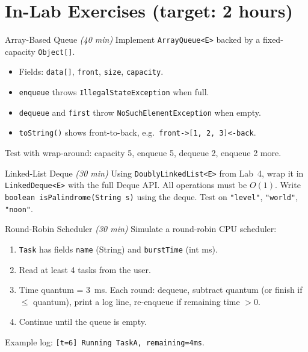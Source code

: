 \documentclass[11pt]{article}
\begin{document}
\section*{In-Lab Exercises (target: 2 hours)}

\begin{labexercise}{Array-Based Queue \hfill {\small \itshape (40 min)}}
Implement \texttt{ArrayQueue<E>} backed by a fixed-capacity \texttt{Object[]}.
\begin{itemize}[leftmargin=*,nosep]
  \item Fields: \texttt{data[]}, \texttt{front}, \texttt{size}, \texttt{capacity}.
  \item \texttt{enqueue} throws \texttt{IllegalStateException} when full.
  \item \texttt{dequeue} and \texttt{first} throw \texttt{NoSuchElementException} when empty.
  \item \texttt{toString()} shows front-to-back, e.g.\ \texttt{front->[1, 2, 3]<-back}.
\end{itemize}
Test with wrap-around: capacity 5, enqueue 5, dequeue 2, enqueue 2 more.
\end{labexercise}

\begin{labexercise}{Linked-List Deque \hfill {\small \itshape (30 min)}}
Using \texttt{DoublyLinkedList<E>} from Lab~4, wrap it in \texttt{LinkedDeque<E>}
with the full Deque API. All operations must be $O(1)$.
Write \texttt{boolean isPalindrome(String s)} using the deque.
Test on \texttt{"level"}, \texttt{"world"}, \texttt{"noon"}.
\end{labexercise}

\begin{labexercise}{Round-Robin Scheduler \hfill {\small \itshape (30 min)}}
Simulate a round-robin CPU scheduler:
\begin{enumerate}[leftmargin=*,nosep]
  \item \texttt{Task} has fields \texttt{name} (String) and \texttt{burstTime} (int ms).
  \item Read at least 4 tasks from the user.
  \item Time quantum = 3~ms. Each round: dequeue, subtract quantum (or finish if $\leq$ quantum),
        print a log line, re-enqueue if remaining time $> 0$.
  \item Continue until the queue is empty.
\end{enumerate}
Example log: \texttt{[t=6] Running TaskA, remaining=4ms}.
\end{labexercise}
\end{document}
